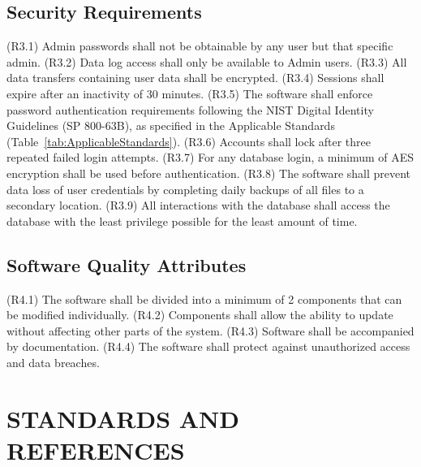 \documentclass[letterpaper,12pt,oneside,listof=totoc]{scrreprt}
\begin{document}
\section{Security Requirements}
(R3.1) Admin passwords shall not be obtainable by any user but that specific admin. \newline
(R3.2) Data log access shall only be available to Admin users.\newline
(R3.3) All data transfers containing user data shall be encrypted.\newline
(R3.4) Sessions shall expire after an inactivity of 30 minutes.\newline
(R3.5) The software shall enforce password authentication requirements following the NIST Digital Identity Guidelines (SP 800-63B), as specified in the Applicable Standards  (Table~\ref{tab:ApplicableStandards}). \newline
(R3.6) Accounts shall lock after three repeated failed login attempts.\newline
(R3.7) For any database login, a minimum of AES encryption shall be used before authentication.\newline
(R3.8) The software shall prevent data loss of user credentials by completing daily backups of all files to a secondary location. \newline
(R3.9) All interactions with the database shall access the database with the least privilege possible for the least amount of time.

\section{Software Quality Attributes}
(R4.1) The software shall be divided into a minimum of 2 components that can be modified individually. \newline
(R4.2) Components shall allow the ability to update without affecting other parts of the system.\newline
(R4.3) Software shall be accompanied by documentation.\newline
(R4.4) The software shall protect against unauthorized access and data breaches.\newline


\chapter{STANDARDS AND REFERENCES}
\end{document}
